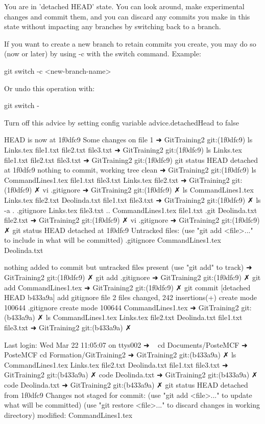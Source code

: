 You are in 'detached HEAD' state. You can look around, make experimental
changes and commit them, and you can discard any commits you make in this
state without impacting any branches by switching back to a branch.

If you want to create a new branch to retain commits you create, you may
do so (now or later) by using -c with the switch command. Example:

  git switch -c <new-branch-name>

Or undo this operation with:

  git switch -

Turn off this advice by setting config variable advice.detachedHead to false

HEAD is now at 1f0dfc9 Some changes on file 1
➜  GitTraining2 git:(1f0dfc9) ls
Links.tex file1.txt file2.txt file3.txt
➜  GitTraining2 git:(1f0dfc9) ls
Links.tex file1.txt file2.txt file3.txt
➜  GitTraining2 git:(1f0dfc9) git status
HEAD detached at 1f0dfc9
nothing to commit, working tree clean
➜  GitTraining2 git:(1f0dfc9) ls
CommandLines1.tex file1.txt         file3.txt
Links.tex         file2.txt
➜  GitTraining2 git:(1f0dfc9) ✗ vi .gitignore
➜  GitTraining2 git:(1f0dfc9) ✗ ls
CommandLines1.tex Links.tex         file2.txt
Deolinda.txt      file1.txt         file3.txt
➜  GitTraining2 git:(1f0dfc9) ✗ ls -a
.                 .gitignore        Links.tex         file3.txt
..                CommandLines1.tex file1.txt
.git              Deolinda.txt      file2.txt
➜  GitTraining2 git:(1f0dfc9) ✗ vi .gitignore
➜  GitTraining2 git:(1f0dfc9) ✗ git status
HEAD detached at 1f0dfc9
Untracked files:
  (use "git add <file>..." to include in what will be committed)
	.gitignore
	CommandLines1.tex
	Deolinda.txt

nothing added to commit but untracked files present (use "git add" to track)
➜  GitTraining2 git:(1f0dfc9) ✗ git add .gitignore 
➜  GitTraining2 git:(1f0dfc9) ✗ git add CommandLines1.tex 
➜  GitTraining2 git:(1f0dfc9) ✗ git commit
[detached HEAD b433a9a] add gitignore file
 2 files changed, 242 insertions(+)
 create mode 100644 .gitignore
 create mode 100644 CommandLines1.tex
➜  GitTraining2 git:(b433a9a) ✗ ls
CommandLines1.tex Links.tex         file2.txt
Deolinda.txt      file1.txt         file3.txt
➜  GitTraining2 git:(b433a9a) ✗ 



Last login: Wed Mar 22 11:05:07 on ttys002
➜  ~ cd Documents/PosteMCF 
➜  PosteMCF cd Formation/GitTraining2 
➜  GitTraining2 git:(b433a9a) ✗ ls
CommandLines1.tex Links.tex         file2.txt
Deolinda.txt      file1.txt         file3.txt
➜  GitTraining2 git:(b433a9a) ✗ code Deolinda.txt 
➜  GitTraining2 git:(b433a9a) ✗ code Deolinda.txt
➜  GitTraining2 git:(b433a9a) ✗ git status
HEAD detached from 1f0dfc9
Changes not staged for commit:
  (use "git add <file>..." to update what will be committed)
  (use "git restore <file>..." to discard changes in working directory)
	modified:   CommandLines1.tex

